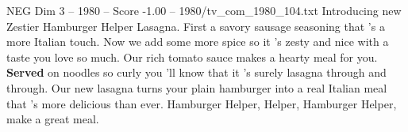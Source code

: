 \begin{textsample}{NEG Dim 3 – 1980 – Score -1.00 – 1980/tv\_com\_1980\_104.txt}  \label{ex:f3_neg_044}
Introducing new Zestier Hamburger Helper Lasagna.
First a savory sausage seasoning that 's a more Italian touch.
Now we add some more spice so it 's zesty and nice with a taste you love so much.
Our rich tomato sauce makes a hearty meal for you. \textbf{Served} on noodles so curly you 'll know that it 's surely lasagna through and through.
Our new lasagna turns your plain hamburger into a real Italian meal that 's more delicious than ever.
Hamburger Helper, Helper, Hamburger Helper, make a great meal.

\end{textsample}
